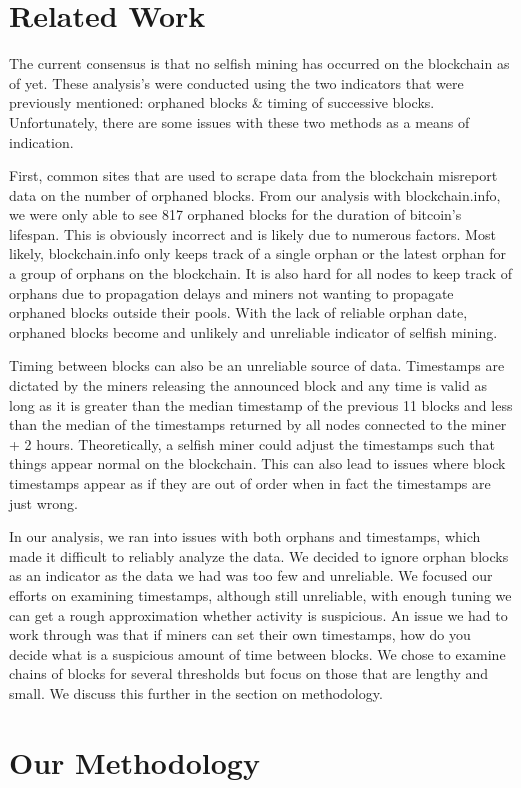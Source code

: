\documentclass{sig-alternate-05-2015}
\begin{document}
\section{Related Work}
The current consensus is that no selfish mining has occurred on the blockchain as of yet. These analysis's were conducted using the two indicators that were previously mentioned: orphaned blocks \& timing of successive blocks. Unfortunately, there are some issues with these two methods as a means of indication. 

First, common sites that are used to scrape data from the blockchain misreport data on the number of orphaned blocks. From our analysis with blockchain.info, we were only able to see 817 orphaned blocks for the duration of bitcoin's lifespan. This is obviously incorrect and is likely due to numerous factors. Most likely, blockchain.info only keeps track of a single orphan or the latest orphan for a group of orphans on the blockchain. It is also hard for all nodes to keep track of orphans due to propagation delays and miners not wanting to propagate orphaned blocks outside their pools. With the lack of reliable orphan date, orphaned blocks become and unlikely and unreliable indicator of selfish mining.

Timing between blocks can also be an unreliable source of data. Timestamps are dictated by the miners releasing the announced block and any time is valid as long as it is greater than the median timestamp of the previous 11 blocks and less than the median of the timestamps returned by all nodes connected to the miner + 2 hours. Theoretically, a selfish miner could adjust the timestamps such that things appear normal on the blockchain. This can also lead to issues where block timestamps appear as if they are out of order when in fact the timestamps are just wrong. 

In our analysis, we ran into issues with both orphans and timestamps, which made it difficult to reliably analyze the data. We decided to ignore orphan blocks as an indicator as the data we had was too few and unreliable. We focused our efforts on examining timestamps, although still unreliable, with enough tuning we can get a rough approximation whether activity is suspicious. An issue we had to work through was that if miners can set their own timestamps, how do you decide what is a suspicious amount of time between blocks. We chose to examine chains of blocks for several thresholds but focus on those that are lengthy and small. We discuss this further in the section on methodology.
\section{Our Methodology}
\end{document}
